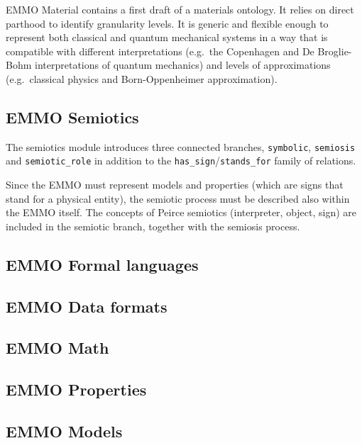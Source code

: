 \documentclass[a4paper,]{report}
\begin{document}
EMMO Material contains a first draft of a materials ontology. It relies
on direct parthood to identify granularity levels. It is generic and
flexible enough to represent both classical and quantum mechanical
systems in a way that is compatible with different interpretations
(e.g.~the Copenhagen and De Broglie-Bohm interpretations of quantum
mechanics) and levels of approximations (e.g.~classical physics and
Born-Oppenheimer approximation).

\hypertarget{emmo-semiotics}{%
\subsection{EMMO Semiotics}\label{emmo-semiotics}}

The semiotics module introduces three connected branches,
\texttt{symbolic}, \texttt{semiosis} and \texttt{semiotic\_role} in
addition to the \texttt{has\_sign}/\texttt{stands\_for} family of
relations.

Since the EMMO must represent models and properties (which are signs
that stand for a physical entity), the semiotic process must be
described also within the EMMO itself. The concepts of Peirce semiotics
(interpreter, object, sign) are included in the semiotic branch,
together with the semiosis process.

\hypertarget{emmo-formal-languages}{%
\subsection{EMMO Formal languages}\label{emmo-formal-languages}}

\hypertarget{emmo-data-formats}{%
\subsection{EMMO Data formats}\label{emmo-data-formats}}

\hypertarget{emmo-math}{%
\subsection{EMMO Math}\label{emmo-math}}

\hypertarget{emmo-properties}{%
\subsection{EMMO Properties}\label{emmo-properties}}

\hypertarget{emmo-models}{%
\subsection{EMMO Models}\label{emmo-models}}
\end{document}
